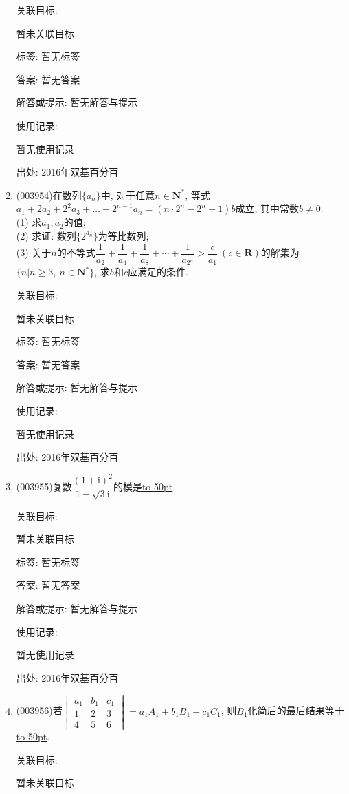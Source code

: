 \documentclass[10pt,a4paper]{article}
\newcommand{\blank}[1]{\underline{\hbox to #1pt{}}}
\begin{document}
\begin{enumerate}[1.]
关联目标:

暂未关联目标



标签: 暂无标签

答案: 暂无答案

解答或提示: 暂无解答与提示

使用记录:

暂无使用记录


出处: 2016年双基百分百
\item { (003954)}在数列$\{a_n\}$中, 对于任意$n\in \mathbf{N}^*$, 等式$a_1+2a_2+2^2a_3+\dots+2^{n-1}a_n=(n\cdot 2^n-2^n+1)b$成立, 其中常数$b\ne 0$.\\
(1) 求$a_1,a_2$的值;\\
(2) 求证: 数列$\{2^{a_n}\}$为等比数列;\\
(3) 关于$n$的不等式$\dfrac{1}{a_2}+\dfrac{1}{a_4}+\dfrac{1}{a_8}+\cdots+\dfrac{1}{a_{2^n}}>\dfrac{c}{a_1} \ (c\in \mathbf{R})$的解集为$\{n|n\ge 3, \ n\in \mathbf{N}^*\}$, 求$b$和$c$应满足的条件.


关联目标:

暂未关联目标



标签: 暂无标签

答案: 暂无答案

解答或提示: 暂无解答与提示

使用记录:

暂无使用记录


出处: 2016年双基百分百
\item { (003955)}复数$\dfrac{(1+\mathrm{i})^2}{1-\sqrt{3}\mathrm{i}}$的模是\blank{50}.


关联目标:

暂未关联目标



标签: 暂无标签

答案: 暂无答案

解答或提示: 暂无解答与提示

使用记录:

暂无使用记录


出处: 2016年双基百分百
\item { (003956)}若$\begin{vmatrix}a_1 & b_1 & c_1\\1 & 2 & 3\\4 & 5 & 6\end{vmatrix}=a_1A_1+b_1B_1+c_1C_1$, 则$B_1$化简后的最后结果等于\blank{50}.


关联目标:

暂未关联目标




\end{enumerate}
\end{document}
